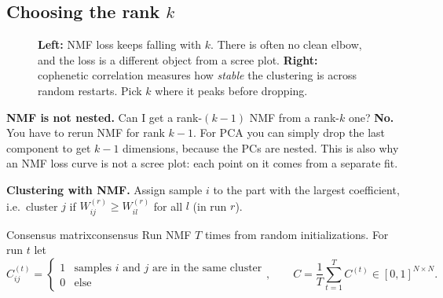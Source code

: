 \documentclass[11pt]{article}
\begin{document}
\subsection{Choosing the rank $k$}

\begin{figure}[htbp]
\centering
{}
\caption{\textbf{Left:} NMF loss keeps falling with $k$. There is often no clean elbow,
and the loss is a different object from a scree plot. \textbf{Right:} cophenetic correlation
measures how \emph{stable} the clustering is across random restarts. Pick $k$ where it peaks
before dropping.}
\end{figure}

\begin{careful}
\textbf{NMF is not nested.} Can I get a rank-$(k-1)$ NMF from a rank-$k$ one? \textbf{No.} You
have to rerun NMF for rank $k-1$. For PCA you can simply drop the last component to get
$k-1$ dimensions, because the PCs are nested. This is also why an NMF loss curve is not
a scree plot: each point on it comes from a separate fit.
\end{careful}

\textbf{Clustering with NMF.} Assign sample $i$ to the part with the largest coefficient,
i.e.\ cluster $j$ if $W^{(r)}_{ij}\ge W^{(r)}_{il}$ for all $l$ (in run $r$).

\begin{definition}{Consensus matrix}{consensus}
Run NMF $T$ times from random initializations. For run $t$ let
\[
C^{(t)}_{ij}=\begin{cases}1&\text{samples } i \text{ and } j \text{ are in the same cluster}\\0&\text{else}\end{cases},
\qquad
C=\frac1T\sum_{t=1}^T C^{(t)}\in[0,1]^{N\times N}.
\]
\end{definition}
\end{document}
